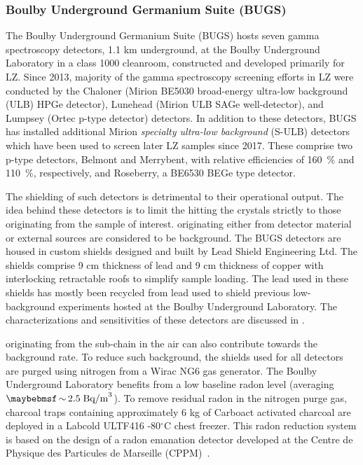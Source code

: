 \subsubsection{Boulby Underground Germanium Suite (BUGS)}

The Boulby Underground Germanium Suite (BUGS) hosts seven gamma spectroscopy detectors, 1.1 km underground, at the Boulby Underground Laboratory in a class 1000 cleanroom, constructed and developed primarily for LZ. Since 2013, majority of the gamma spectroscopy screening efforts in LZ were conducted by the Chaloner (Mirion BE5030 broad-energy ultra-low background (ULB) HPGe detector), Lunehead (Mirion ULB SAGe well-detector), and Lumpsey (Ortec p-type detector) detectors. In addition to these detectors, BUGS has installed additional Mirion \textit{specialty ultra-low background} (S-ULB) detectors which have been used to screen later LZ samples since 2017. These comprise two p-type detectors, Belmont and Merrybent, with relative efficiencies of \SI{160}{\percent} and \SI{110}{\percent}, respectively, and Roseberry, a BE6530 BEGe type detector.

The shielding of such detectors is detrimental to their operational output. The idea behind these detectors is to limit the \grays{} hitting the crystals strictly to those originating from the sample of interest. \grays{} originating either from detector material or external sources are considered to be background. The BUGS detectors are housed in custom shields designed and built by Lead Shield Engineering Ltd. The shields comprise 9 cm thickness of lead and 9 cm thickness of copper with interlocking retractable roofs to simplify sample loading. The lead used in these shields has mostly been recycled from lead used to shield previous low-background experiments hosted at the Boulby Underground Laboratory. The characterizations and sensitivities of these detectors are discussed in \cite{bugs_boulby}.

\grays{} originating from the \RnTTT{} sub-chain in the air can also contribute towards the background rate. To reduce such background, the shields used for all detectors are purged using nitrogen from a Wirac NG6 gas generator. The Boulby Underground Laboratory benefits from a low baseline radon level (averaging $\sim2.5 \; \MathText{Bq/m}^3$). To remove residual radon in the nitrogen purge gas, charcoal traps containing approximately 6 kg of Carboact activated charcoal are deployed in a Labcold ULTF416 -80$^{\circ}$C chest freezer. This radon reduction system is based on the design of a radon emanation detector developed at the Centre de Physique des Particules de Marseille (CPPM)~\cite{Noel:2015nla}. 


